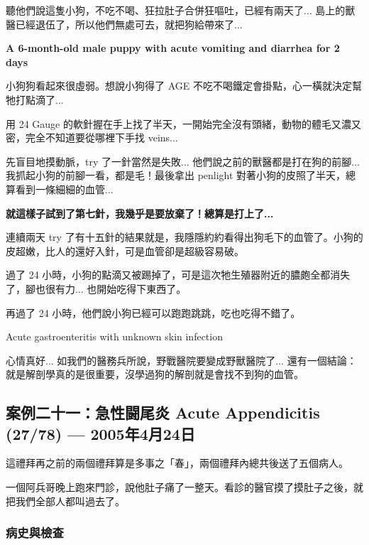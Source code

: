 \documentclass[12pt,a4paper]{article}
\newenvironment{myquote}{%
    \begin{tcolorbox}[
        colback=quote_bg,
        colframe=emergency_gray,
        boxrule=0pt,
        leftrule=3pt,
        arc=0pt,
        left=10pt,
        right=10pt,
        top=8pt,
        bottom=8pt
    ]
    \itshape
}{%
    \end{tcolorbox}
}
\begin{document}
聽他們說這隻小狗，不吃不喝、狂拉肚子合併狂嘔吐，已經有兩天了... 島上的獸醫已經退伍了，所以他們無處可去，就把狗給帶來了...

\textbf{A 6-month-old male puppy with acute vomiting and diarrhea for 2 days}

小狗狗看起來很虛弱。想說小狗得了 AGE 不吃不喝鐵定會掛點，心一橫就決定幫牠打點滴了...

用 24 Gauge 的軟針握在手上找了半天，一開始完全沒有頭緒，動物的體毛又濃又密，完全不知道要從哪裡下手找 veins...

先盲目地摸動脈，try 了一針當然是失敗... 他們說之前的獸醫都是打在狗的前腳... 我抓起小狗的前腳一看，都是毛！最後拿出 penlight 對著小狗的皮照了半天，總算看到一條細細的血管...

\textbf{就這樣子試到了第七針，我幾乎是要放棄了！總算是打上了...}

連續兩天 try 了有十五針的結果就是，我隱隱約約看得出狗毛下的血管了。小狗的皮超嫩，比人的還好入針，可是血管卻是超級容易破。

過了 24 小時，小狗的點滴又被踢掉了，可是這次牠生殖器附近的膿皰全都消失了，腳也很有力... 也開始吃得下東西了。

再過了 24 小時，他們說小狗已經可以跑跑跳跳，吃也吃得不錯了。

\begin{tcolorbox}[
    colback=emergency_blue!10!white,
    colframe=emergency_blue,
    title=\textbf{Diagnosis},
    fonttitle=\bfseries
]
Acute gastroenteritis with unknown skin infection
\end{tcolorbox}

\begin{myquote}
心情真好... 如我們的醫務兵所說，野戰醫院要變成野獸醫院了... 還有一個結論：就是解剖學真的是很重要，沒學過狗的解剖就是會找不到狗的血管。
\end{myquote}

\subsection{案例二十一：急性闘尾炎 Acute Appendicitis (27/78) — 2005年4月24日}

這禮拜再之前的兩個禮拜算是多事之「春」，兩個禮拜內總共後送了五個病人。

一個阿兵哥晚上跑來門診，說他肚子痛了一整天。看診的醫官摸了摸肚子之後，就把我們全部人都叫過去了。

\subsubsection{病史與檢查}
\end{document}
